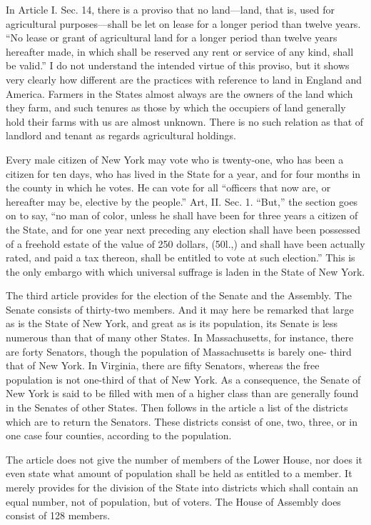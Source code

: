 In Article I. Sec. 14, there is a proviso that no land---land, that
is, used for agricultural purposes---shall be let on lease for a
longer period than twelve years.  ``No lease or grant of
agricultural land for a longer period than twelve years hereafter
made, in which shall be reserved any rent or service of any kind,
shall be valid.''  I do not understand the intended virtue of this
proviso, but it shows very clearly how different are the practices
with reference to land in England and America.  Farmers in the
States almost always are the owners of the land which they farm,
and such tenures as those by which the occupiers of land generally
hold their farms with us are almost unknown.  There is no such
relation as that of landlord and tenant as regards agricultural
holdings.

Every male citizen of New York may vote who is twenty-one, who has
been a citizen for ten days, who has lived in the State for a year,
and for four months in the county in which he votes.  He can vote
for all ``officers that now are, or hereafter may be, elective by
the people.''  Art, II. Sec. 1.  ``But,'' the section goes on to say,
``no man of color, unless he shall have been for three years a
citizen of the State, and for one year next preceding any election
shall have been possessed of a freehold estate of the value of 250
dollars, (50l.,) and shall have been actually rated, and paid a tax
thereon, shall be entitled to vote at such election.''  This is the
only embargo with which universal suffrage is laden in the State of
New York.

The third article provides for the election of the Senate and the
Assembly.  The Senate consists of thirty-two members.  And it may
here be remarked that large as is the State of New York, and great
as is its population, its Senate is less numerous than that of many
other States.  In Massachusetts, for instance, there are forty
Senators, though the population of Massachusetts is barely one-
third that of New York.  In Virginia, there are fifty Senators,
whereas the free population is not one-third of that of New York.
As a consequence, the Senate of New York is said to be filled with
men of a higher class than are generally found in the Senates of
other States.  Then follows in the article a list of the districts
which are to return the Senators.  These districts consist of one,
two, three, or in one case four counties, according to the
population.

The article does not give the number of members of the Lower House,
nor does it even state what amount of population shall be held as
entitled to a member.  It merely provides for the division of the
State into districts which shall contain an equal number, not of
population, but of voters.  The House of Assembly does consist of
128 members.

